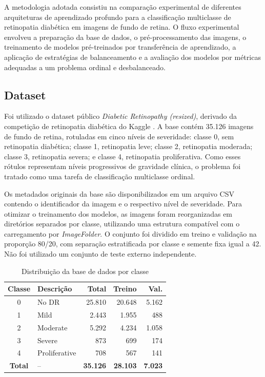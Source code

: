 \documentclass[conference]{IEEEtran}
\begin{document}
A metodologia adotada consistiu na compara\c{c}\~ao experimental de
diferentes arquiteturas de aprendizado profundo para a classifica\c{c}\~ao
multiclasse de retinopatia diab\'etica em imagens de fundo de retina.
O fluxo experimental envolveu a prepara\c{c}\~ao da base de dados, o
pr\'e-processamento das imagens, o treinamento de modelos pr\'e-treinados
por transfer\^encia de aprendizado, a aplica\c{c}\~ao de estrat\'egias
de balanceamento e a avalia\c{c}\~ao dos modelos por m\'etricas
adequadas a um problema ordinal e desbalanceado.

\subsection{Dataset}

Foi utilizado o dataset p\'ublico \textit{Diabetic Retinopathy
(resized)}\cite{dataset}, derivado da competi\c{c}\~ao de retinopatia
diab\'etica do Kaggle \cite{APTOS2019}. A base cont\'em 35.126 imagens
de fundo de retina, rotuladas em cinco n\'iveis de severidade: classe 0,
sem retinopatia diab\'etica; classe 1, retinopatia leve; classe 2,
retinopatia moderada; classe 3, retinopatia severa; e classe 4,
retinopatia proliferativa. Como esses r\'otulos representam n\'iveis
progressivos de gravidade cl\'inica, o problema foi tratado como uma
tarefa de classifica\c{c}\~ao multiclasse ordinal.

Os metadados originais da base s\~ao disponibilizados em um arquivo CSV
contendo o identificador da imagem e o respectivo n\'ivel de severidade.
Para otimizar o treinamento dos modelos, as imagens foram reorganizadas
em diret\'orios separados por classe, utilizando uma estrutura compat\'ivel
com o carregamento por \textit{ImageFolder}. O conjunto foi dividido em
treino e valida\c{c}\~ao na propor\c{c}\~ao 80/20, com separa\c{c}\~ao
estratificada por classe e semente fixa igual a 42. N\~ao foi utilizado
um conjunto de teste externo independente.

\begin{table}[htbp]
\caption{Distribui\c{c}\~ao da base de dados por classe}
\label{tab:distribuicao_base}
\centering
\scriptsize
\begin{tabular}{c l r r r}
\hline
\textbf{Classe} & \textbf{Descri\c{c}\~ao} & \textbf{Total} &
\textbf{Treino} & \textbf{Val.} \\
\hline
0 & No DR         & 25.810 & 20.648 & 5.162 \\
1 & Mild          &  2.443 &  1.955 &   488 \\
2 & Moderate      &  5.292 &  4.234 & 1.058 \\
3 & Severe        &    873 &    699 &   174 \\
4 & Proliferative &    708 &    567 &   141 \\
\hline
\textbf{Total} & -- & \textbf{35.126} & \textbf{28.103} & \textbf{7.023} \\
\hline
\end{tabular}
\end{table}
\end{document}
